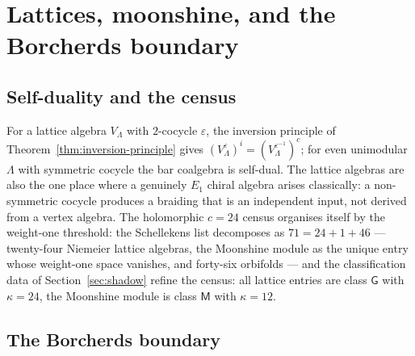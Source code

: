 \documentclass[11pt]{amsart}
\numberwithin{equation}{section}
\theoremstyle{plain}
\theoremstyle{definition}
\theoremstyle{remark}
\begin{document}
\section{Lattices, moonshine, and the Borcherds boundary}
\label{sec:moonshine}

\subsection{Self-duality and the census}

For a lattice algebra $V_\Lambda$ with $2$-cocycle $\varepsilon$, the
inversion principle of Theorem~\ref{thm:inversion-principle} gives
$(V_\Lambda^{\varepsilon})^{i}=(V_\Lambda^{\varepsilon^{-1}})^{c}$; for
even unimodular $\Lambda$ with symmetric cocycle the bar coalgebra is
self-dual. The lattice algebras are also the one place where a
genuinely $E_1$ chiral algebra arises classically: a non-symmetric
cocycle produces a braiding that is an independent input, not derived
from a vertex algebra. The holomorphic $c=24$ census organises itself
by the weight-one threshold: the Schellekens list \cite{Schellekens} decomposes as
$71=24+1+46$ --- twenty-four Niemeier lattice algebras, the Moonshine
module as the unique entry whose weight-one space vanishes, and forty-six
orbifolds --- and the classification data of
Section~\ref{sec:shadow} refine the census: all lattice entries are
class $\mathsf{G}$ with $\kappa=24$, the Moonshine module is class
$\mathsf{M}$ with $\kappa=12$.

\subsection{The Borcherds boundary}
\end{document}
